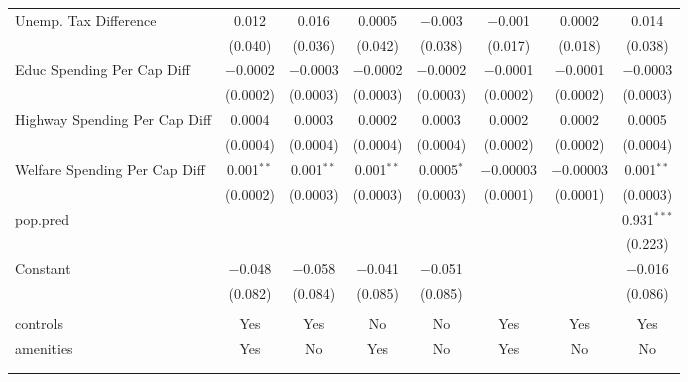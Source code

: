\begin{table}[!htbp]
\begin{tabular}{@{\extracolsep{5pt}}lccccccc}
  Unemp. Tax Difference & 0.012 & 0.016 & 0.0005 & $-$0.003 & $-$0.001 & 0.0002 & 0.014 \\ 
  & (0.040) & (0.036) & (0.042) & (0.038) & (0.017) & (0.018) & (0.038) \\ 
  Educ Spending Per Cap Diff & $-$0.0002 & $-$0.0003 & $-$0.0002 & $-$0.0002 & $-$0.0001 & $-$0.0001 & $-$0.0003 \\ 
  & (0.0002) & (0.0003) & (0.0003) & (0.0003) & (0.0002) & (0.0002) & (0.0003) \\ 
  Highway Spending Per Cap Diff & 0.0004 & 0.0003 & 0.0002 & 0.0003 & 0.0002 & 0.0002 & 0.0005 \\ 
  & (0.0004) & (0.0004) & (0.0004) & (0.0004) & (0.0002) & (0.0002) & (0.0004) \\ 
  Welfare Spending Per Cap Diff & 0.001$^{**}$ & 0.001$^{**}$ & 0.001$^{**}$ & 0.0005$^{*}$ & $-$0.00003 & $-$0.00003 & 0.001$^{**}$ \\ 
  & (0.0002) & (0.0003) & (0.0003) & (0.0003) & (0.0001) & (0.0001) & (0.0003) \\ 
  pop.pred &  &  &  &  &  &  & 0.931$^{***}$ \\ 
  &  &  &  &  &  &  & (0.223) \\ 
  Constant & $-$0.048 & $-$0.058 & $-$0.041 & $-$0.051 &  &  & $-$0.016 \\ 
  & (0.082) & (0.084) & (0.085) & (0.085) &  &  & (0.086) \\ 
 \hline \\[-1.8ex] 
controls & Yes & Yes & No & No & Yes & Yes & Yes \\ 
amenities & Yes & No & Yes & No & Yes & No & No \\ 
\hline \\[-1.8ex] 
\hline 
\hline \\[-1.8ex] 
\end{tabular} 
\end{table} 

